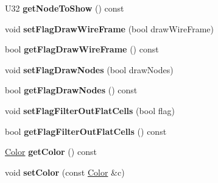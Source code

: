 \begin{DoxyCompactItemize}
\item 
\hypertarget{classps_1_1elastic_1_1VolMesh_aebd1d9e8d715d747218bc82f05d2beac}{}U32 {\bfseries get\+Node\+To\+Show} () const \label{classps_1_1elastic_1_1VolMesh_aebd1d9e8d715d747218bc82f05d2beac}

\item 
\hypertarget{classps_1_1elastic_1_1VolMesh_adb03f406b1622d57049b4e83194cab50}{}void {\bfseries set\+Flag\+Draw\+Wire\+Frame} (bool draw\+Wire\+Frame)\label{classps_1_1elastic_1_1VolMesh_adb03f406b1622d57049b4e83194cab50}

\item 
\hypertarget{classps_1_1elastic_1_1VolMesh_a8c3fde2f947e739db79303cf1bb373fb}{}bool {\bfseries get\+Flag\+Draw\+Wire\+Frame} () const \label{classps_1_1elastic_1_1VolMesh_a8c3fde2f947e739db79303cf1bb373fb}

\item 
\hypertarget{classps_1_1elastic_1_1VolMesh_af7d3b4ce18468c34cee2744313f9f7f3}{}void {\bfseries set\+Flag\+Draw\+Nodes} (bool draw\+Nodes)\label{classps_1_1elastic_1_1VolMesh_af7d3b4ce18468c34cee2744313f9f7f3}

\item 
\hypertarget{classps_1_1elastic_1_1VolMesh_a4b6d0d1392097bb3614942ad31ad9db5}{}bool {\bfseries get\+Flag\+Draw\+Nodes} () const \label{classps_1_1elastic_1_1VolMesh_a4b6d0d1392097bb3614942ad31ad9db5}

\item 
\hypertarget{classps_1_1elastic_1_1VolMesh_ac1b42580f896ad58c076e0a326ff38a4}{}void {\bfseries set\+Flag\+Filter\+Out\+Flat\+Cells} (bool flag)\label{classps_1_1elastic_1_1VolMesh_ac1b42580f896ad58c076e0a326ff38a4}

\item 
\hypertarget{classps_1_1elastic_1_1VolMesh_a649a2c0ee8725e248383b2db9b763e31}{}bool {\bfseries get\+Flag\+Filter\+Out\+Flat\+Cells} () const \label{classps_1_1elastic_1_1VolMesh_a649a2c0ee8725e248383b2db9b763e31}

\item 
\hypertarget{classps_1_1elastic_1_1VolMesh_a5970a04c412bad03c25486514fef2dc1}{}\hyperlink{classps_1_1base_1_1Color}{Color} {\bfseries get\+Color} () const \label{classps_1_1elastic_1_1VolMesh_a5970a04c412bad03c25486514fef2dc1}

\item 
\hypertarget{classps_1_1elastic_1_1VolMesh_aeb013656c4952cf4351e1f0303dae8a4}{}void {\bfseries set\+Color} (const \hyperlink{classps_1_1base_1_1Color}{Color} \&c)\label{classps_1_1elastic_1_1VolMesh_aeb013656c4952cf4351e1f0303dae8a4}


\end{DoxyCompactItemize}

